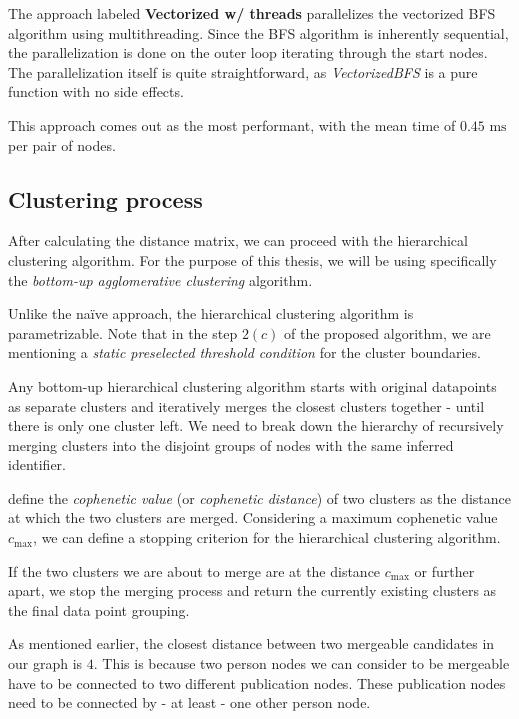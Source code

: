The approach labeled \textbf{Vectorized w/ threads} parallelizes the vectorized BFS algorithm using multithreading.
Since the BFS algorithm is inherently sequential, the parallelization is done on the outer loop iterating through the start nodes.
The parallelization itself is quite straightforward, as \textit{VectorizedBFS} is a pure function with no side effects.

This approach comes out as the most performant, with the mean time of $0.45\text{ ms}$ per pair of nodes.

\subsection{Clustering process}\label{sec:clustering-process}

After calculating the distance matrix, we can proceed with the hierarchical clustering algorithm.
For the purpose of this thesis, we will be using specifically the \textit{bottom-up agglomerative clustering} algorithm.

Unlike the naïve approach, the hierarchical clustering algorithm is parametrizable. Note that in the step $2(c)$ of the proposed algorithm, 
we are mentioning a \textit{static preselected threshold condition} for the cluster boundaries.

Any bottom-up hierarchical clustering algorithm starts with original datapoints as separate clusters and iteratively merges the closest clusters together - until there is only one cluster left.
We need to break down the hierarchy of recursively merging clusters into the disjoint groups of nodes with the same inferred identifier.

\cite{cophenetic} define the \textit{cophenetic value} (or \textit{cophenetic distance}) of two clusters as the distance at which the two clusters are merged.
Considering a maximum cophenetic value $c_{\text{max}}$, we can define a stopping criterion for the hierarchical clustering algorithm.

If the two clusters we are about to merge are at the distance $c_{\text{max}}$ or further apart, we stop the merging process and 
return the currently existing clusters as the final data point grouping.

As mentioned earlier, the closest distance between two mergeable candidates in our graph is $4$. 
This is because two person nodes we can consider to be mergeable have to be connected to two different publication nodes.
These publication nodes need to be connected by - at least - one other person node.


